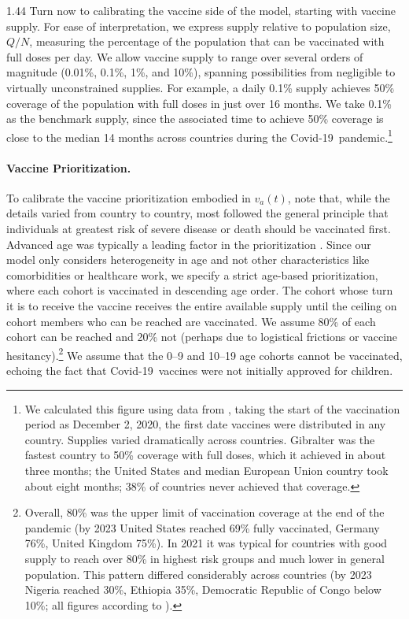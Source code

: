\documentclass[12pt]{article}
\newcommand{\covid}{Covid-19}
\begin{document}
\begin{spacing}{1.44}
Turn now to calibrating the vaccine side of the model, starting with
vaccine supply. For ease of interpretation, we express supply relative to population size, $Q/N$, measuring the percentage of the population that can be vaccinated with full doses per day. We allow vaccine supply to range over several orders of magnitude
(0.01\%, 0.1\%, 1\%, and 10\%), spanning possibilities from negligible
to virtually unconstrained supplies. For example, a daily 0.1\% supply
achieves 50\% coverage of the population with full doses in just over
16 months. We take 0.1\% as the benchmark supply, since the associated
time to achieve 50\% coverage is close to the median 14 months across
countries during the \covid\ pandemic.\footnote{We calculated this
figure using data from \citet{OWID_COVID_Vax}, taking the start of the
vaccination period as December 2, 2020, the first date vaccines were
distributed in any country. Supplies varied dramatically across
countries. Gibralter was the fastest country to 50\% coverage with
full doses, which it achieved in about three months; the United States
and median European Union country took about eight months; 38\% of
countries never achieved that coverage.}

\paragraph{Vaccine Prioritization.}

To calibrate the vaccine prioritization embodied in $v_a(t)$, note
that, while the details varied from country to country, most followed
the general principle that individuals at greatest risk of severe
disease or death should be vaccinated first. Advanced age was
typically a leading factor in the prioritization
\citep{WHO2020,Williams2021}. Since our model only considers
heterogeneity in age and not other characteristics like comorbidities
or healthcare work, we specify a strict age-based prioritization,
where each cohort is vaccinated in descending age order. The cohort
whose turn it is to receive the vaccine receives the entire
available supply until the ceiling on cohort members who can be reached are vaccinated. We assume
80\% of each cohort can be reached and 20\% not (perhaps
due to logistical frictions or vaccine hesitancy).\footnote{Overall,
80\% was the upper limit of vaccination coverage at the end of the
pandemic (by 2023 United States reached 69\% fully vaccinated, Germany
76\%, United Kingdom 75\%). In 2021 it was typical for countries with
good supply to reach over 80\% in highest risk groups and much lower
in general population. This pattern differed considerably across
countries (by 2023 Nigeria reached 30\%, Ethiopia 35\%, Democratic
Republic of Congo below 10\%; all figures according to
\citet{OWID_COVID_Vax}).} We assume that the 0--9 and 10--19 age cohorts
cannot be vaccinated, echoing the fact that \covid\ vaccines were not
initially approved for children.


\end{spacing}
\end{document}
